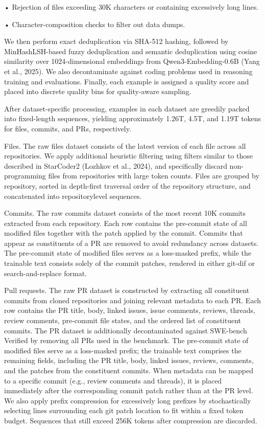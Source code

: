 \documentclass[
  10
]{article}
\begin{document}
• Rejection of files exceeding 30K characters or containing excessively
long lines.

• Character-composition checks to filter out data dumps.

We then perform exact deduplication via SHA-512 hashing, followed by
MinHashLSH-based fuzzy deduplication and semantic deduplication using
cosine similarity over 1024-dimensional embeddings from
Qwen3-Embedding-0.6B (Yang et al., 2025). We also decontaminate against
coding problems used in reasoning training and evaluations. Finally,
each example is assigned a quality score and placed into discrete
quality bins for quality-aware sampling.

After dataset-specific processing, examples in each dataset are greedily
packed into fixed-length sequences, yielding approximately 1.26T, 4.5T,
and 1.19T tokens for files, commits, and PRs, respectively.

Files. The raw files dataset consists of the latest version of each file
across all repositories. We apply additional heuristic filtering using
filters similar to those described in StarCoder2 (Lozhkov et al., 2024),
and specifically discard non-programming files from repositories with
large token counts. Files are grouped by repository, sorted in
depth-first traversal order of the repository structure, and
concatenated into repositorylevel sequences.

Commits. The raw commits dataset consists of the most recent 10K commits
extracted from each repository. Each row contains the pre-commit state
of all modified files together with the patch applied by the commit.
Commits that appear as constituents of a PR are removed to avoid
redundancy across datasets. The pre-commit state of modified files
serves as a loss-masked prefix, while the trainable text consists solely
of the commit patches, rendered in either git-dif or search-and-replace
format.

Pull requests. The raw PR dataset is constructed by extracting all
constituent commits from cloned repositories and joining relevant
metadata to each PR. Each row contains the PR title, body, linked
issues, issue comments, reviews, threads, review comments, pre-commit
file states, and the ordered list of constituent commits. The PR dataset
is additionally decontaminated against SWE-bench Verified by removing
all PRs used in the benchmark. The pre-commit state of modified files
serve as a loss-masked prefix; the trainable text comprises the
remaining fields, including the PR title, body, linked issues, reviews,
comments, and the patches from the constituent commits. When metadata
can be mapped to a specific commit (e.g., review comments and threads),
it is placed immediately after the corresponding commit patch rather
than at the PR level. We also apply prefix compression for excessively
long prefixes by stochastically selecting lines surrounding each git
patch location to fit within a fixed token budget. Sequences that still
exceed 256K tokens after compression are discarded.
\end{document}
